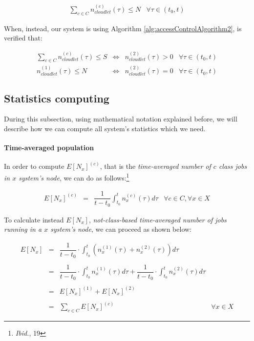 \documentclass[10pt,a4paper]{article}
\begin{document}
\begin{equation}
\begin{array} {lr} 
\displaystyle \sum_{c \in C} n_{cloudlet}^{(c)}(\tau) \leq N & \forall \tau \in (t_0, t)
\end{array}
\end{equation}

When, instead, our system is using Algorithm \ref{alg:accessControlAlgorithm2}, is verified that:

\begin{equation}
\begin{array} {rccr} 
\displaystyle \sum_{c \in C} n_{cloudlet}^{(c)}(\tau) \leq S & \Leftrightarrow & n_{cloudlet}^{(2)}(\tau) > 0 & \forall \tau \in (t_0, t) \\
n_{cloudlet}^{(1)}(\tau) \leq N & \Leftrightarrow & n_{cloudlet}^{(2)}(\tau) = 0 & \forall \tau \in (t_0, t)
\end{array}
\end{equation}

\subsection{Statistics computing}

During this subsection, using mathematical notation explained before, we will describe how we can compute all system's statistics which we need.

\paragraph{Time-averaged population}

In order to compute $E[N_x]^{(c)}$, that is the \textit{time-averaged number of $c$ class jobs in $x$ system's node}, we can do as follows:\footnote{\textit{Ibid.}, 19}

\begin{equation}
\begin{array} {rclr} 
E[N_x]^{(c)} & = & \displaystyle  \dfrac{1}{t-t_0}\int_{t_0}^t n_x^{(c)}(\tau)d\tau & \forall c \in C, \forall x \in X
\end{array}
\end{equation}

To calculate instead $E[N_x]$, \textit{not-class-based time-averaged number of jobs running in a $x$ system's node}, we can proceed as shown below:

\begin{equation}
\begin{array} {rclr} 
E[N_x] & = & \displaystyle  \dfrac{1}{t-t_0} \cdot \int_{t_0}^t \left( n_x^{(1)}(\tau) + n_x^{(2)}(\tau) \right) d\tau \\\\
	   & = & \displaystyle  \dfrac{1}{t-t_0} \cdot \int_{t_0}^t n_x^{(1)}(\tau)d\tau + \dfrac{1}{t-t_0} \cdot \int_{t_0}^t n_x^{(2)}(\tau)d\tau \\\\
	   & = & E[N_x]^{(1)} + E[N_x]^{(2)} \\\\
	   & = & \displaystyle  \sum_{c \in C} E[N_x]^{(c)} & \forall x \in X
\end{array}
\end{equation}
\end{document}
